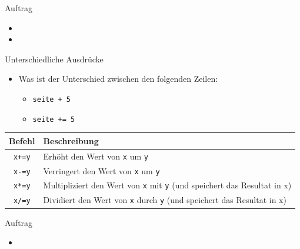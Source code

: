 \begin{frame}{Auftrag}
    \begin{itemize}
        \item {}
        \item {}
    \end{itemize}
\end{frame}

\begin{frame}{Unterschiedliche Ausdrücke}
    \begin{itemize}
        \item Was ist der Unterschied zwischen den folgenden Zeilen:
              \begin{itemize}
                  \item \lstinline|seite + 5|
                  \item \lstinline|seite += 5|
              \end{itemize}
    \end{itemize}
    \begin{table}[H]
        \centering
        \begin{tabular}{cp{6cm}}
            Befehl           & Beschreibung                                                                                 \\\midrule
            \lstinline|x+=y| & Erhöht den Wert von \lstinline|x| um \lstinline|y|                                           \\\midrule
            \lstinline|x-=y| & Verringert den Wert von \lstinline|x| um \lstinline|y|                                       \\\midrule
            \lstinline|x*=y| & Multipliziert den Wert von \lstinline|x| mit \lstinline|y| (und speichert das Resultat in x) \\\midrule
            \lstinline|x/=y| & Dividiert den Wert von \lstinline|x| durch \lstinline|y| (und speichert das Resultat in x)
        \end{tabular}
    \end{table}
\end{frame}

\begin{frame}{Auftrag}
    \begin{itemize}
        \item {}
    \end{itemize}
\end{frame}

